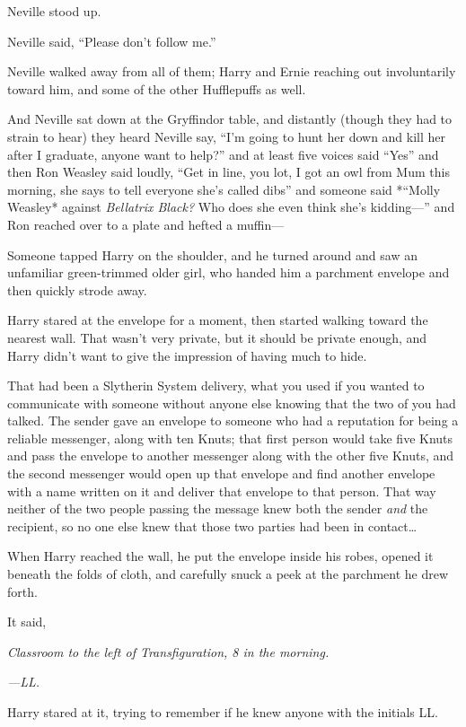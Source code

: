 Neville stood up.

Neville said, ``Please don't follow me.''

Neville walked away from all of them; Harry and Ernie reaching out
involuntarily toward him, and some of the other Hufflepuffs as well.

And Neville sat down at the Gryffindor table, and distantly (though they
had to strain to hear) they heard Neville say, ``I'm going to hunt her
down and kill her after I graduate, anyone want to help?'' and at least
five voices said ``Yes'' and then Ron Weasley said loudly, ``Get in
line, you lot, I got an owl from Mum this morning, she says to tell
everyone she's called dibs'' and someone said *``Molly Weasley* against
\emph{Bellatrix Black?} Who does she even think she's kidding---'' and
Ron reached over to a plate and hefted a muffin---

Someone tapped Harry on the shoulder, and he turned around and saw an
unfamiliar green-trimmed older girl, who handed him a parchment envelope
and then quickly strode away.

Harry stared at the envelope for a moment, then started walking toward
the nearest wall. That wasn't very private, but it should be private
enough, and Harry didn't want to give the impression of having much to
hide.

That had been a Slytherin System delivery, what you used if you wanted
to communicate with someone without anyone else knowing that the two of
you had talked. The sender gave an envelope to someone who had a
reputation for being a reliable messenger, along with ten Knuts; that
first person would take five Knuts and pass the envelope to another
messenger along with the other five Knuts, and the second messenger
would open up that envelope and find another envelope with a name
written on it and deliver that envelope to that person. That way neither
of the two people passing the message knew both the sender \emph{and}
the recipient, so no one else knew that those two parties had been in
contact\ldots{}

When Harry reached the wall, he put the envelope inside his robes,
opened it beneath the folds of cloth, and carefully snuck a peek at the
parchment he drew forth.

It said,

\emph{Classroom to the left of Transfiguration, 8 in the morning.}

\emph{---LL.}

Harry stared at it, trying to remember if he knew anyone with the
initials LL.

